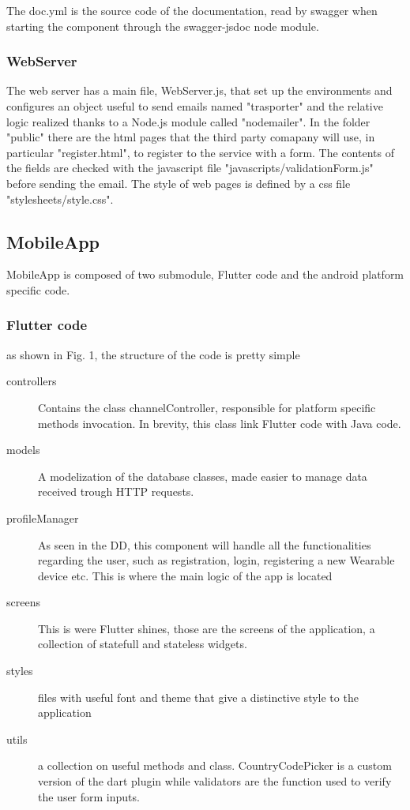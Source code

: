 \documentclass[../main.tex]{subfiles}
\begin{document}
The doc.yml is the source code of the documentation, read by swagger when starting the component through the swagger-jsdoc node module.

\subsubsection{WebServer}

The web server has a main file, WebServer.js, that set up the environments and configures an object useful to send emails named "trasporter" and the relative logic realized thanks to a Node.js module called "nodemailer".
In the folder "public" there are the html pages that the third party comapany will use, in particular "register.html", to register to the service with a form. The contents of the fields are checked with the javascript file "javascripts/validationForm.js" before sending the email.
The style of web pages is defined by a css file "stylesheets/style.css".

\subsection{MobileApp}
MobileApp is composed of two submodule, Flutter code and the android platform specific code.

\subsubsection{Flutter code}
as shown in Fig. 1, the structure of the code is pretty simple
\begin{description}
	\item[controllers] Contains the class channelController, responsible for platform specific methods invocation. In brevity, this class link Flutter code with Java code.
	\item[models] A modelization of the database classes, made easier to manage data received trough HTTP requests.
	\item[profileManager] As seen in the DD, this component will handle all the functionalities regarding the user, such as registration, login, registering a new Wearable device etc. This is where the main logic of the app is located
	\item[screens] This is were Flutter shines, those are the screens of the application, a collection of statefull and stateless widgets.
	\item[styles] files with useful font and theme that give a distinctive style to the application
	\item[utils] a collection on useful methods and class. CountryCodePicker is a custom version of the dart plugin while validators are the function used to verify the user form inputs.
\end{description}
\end{document}
